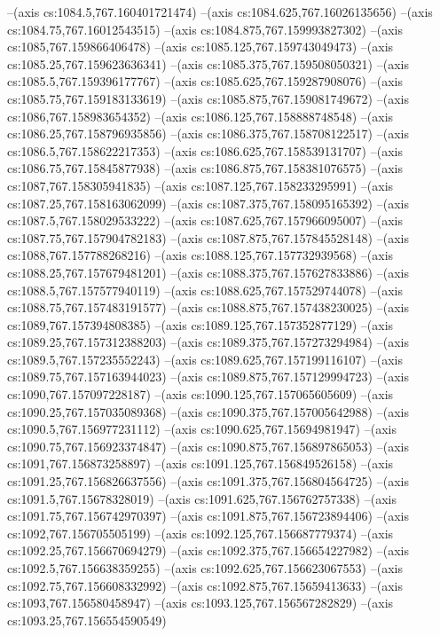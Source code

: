 --(axis cs:1084.5,767.160401721474)
--(axis cs:1084.625,767.16026135656)
--(axis cs:1084.75,767.16012543515)
--(axis cs:1084.875,767.159993827302)
--(axis cs:1085,767.159866406478)
--(axis cs:1085.125,767.159743049473)
--(axis cs:1085.25,767.159623636341)
--(axis cs:1085.375,767.159508050321)
--(axis cs:1085.5,767.159396177767)
--(axis cs:1085.625,767.159287908076)
--(axis cs:1085.75,767.159183133619)
--(axis cs:1085.875,767.159081749672)
--(axis cs:1086,767.158983654352)
--(axis cs:1086.125,767.158888748548)
--(axis cs:1086.25,767.158796935856)
--(axis cs:1086.375,767.158708122517)
--(axis cs:1086.5,767.158622217353)
--(axis cs:1086.625,767.158539131707)
--(axis cs:1086.75,767.15845877938)
--(axis cs:1086.875,767.158381076575)
--(axis cs:1087,767.158305941835)
--(axis cs:1087.125,767.158233295991)
--(axis cs:1087.25,767.158163062099)
--(axis cs:1087.375,767.158095165392)
--(axis cs:1087.5,767.158029533222)
--(axis cs:1087.625,767.157966095007)
--(axis cs:1087.75,767.157904782183)
--(axis cs:1087.875,767.157845528148)
--(axis cs:1088,767.157788268216)
--(axis cs:1088.125,767.157732939568)
--(axis cs:1088.25,767.157679481201)
--(axis cs:1088.375,767.157627833886)
--(axis cs:1088.5,767.157577940119)
--(axis cs:1088.625,767.157529744078)
--(axis cs:1088.75,767.157483191577)
--(axis cs:1088.875,767.157438230025)
--(axis cs:1089,767.157394808385)
--(axis cs:1089.125,767.157352877129)
--(axis cs:1089.25,767.157312388203)
--(axis cs:1089.375,767.157273294984)
--(axis cs:1089.5,767.157235552243)
--(axis cs:1089.625,767.157199116107)
--(axis cs:1089.75,767.157163944023)
--(axis cs:1089.875,767.157129994723)
--(axis cs:1090,767.157097228187)
--(axis cs:1090.125,767.157065605609)
--(axis cs:1090.25,767.157035089368)
--(axis cs:1090.375,767.157005642988)
--(axis cs:1090.5,767.156977231112)
--(axis cs:1090.625,767.15694981947)
--(axis cs:1090.75,767.156923374847)
--(axis cs:1090.875,767.156897865053)
--(axis cs:1091,767.156873258897)
--(axis cs:1091.125,767.156849526158)
--(axis cs:1091.25,767.156826637556)
--(axis cs:1091.375,767.156804564725)
--(axis cs:1091.5,767.15678328019)
--(axis cs:1091.625,767.156762757338)
--(axis cs:1091.75,767.156742970397)
--(axis cs:1091.875,767.156723894406)
--(axis cs:1092,767.156705505199)
--(axis cs:1092.125,767.156687779374)
--(axis cs:1092.25,767.156670694279)
--(axis cs:1092.375,767.156654227982)
--(axis cs:1092.5,767.156638359255)
--(axis cs:1092.625,767.156623067553)
--(axis cs:1092.75,767.156608332992)
--(axis cs:1092.875,767.15659413633)
--(axis cs:1093,767.156580458947)
--(axis cs:1093.125,767.156567282829)
--(axis cs:1093.25,767.156554590549)
